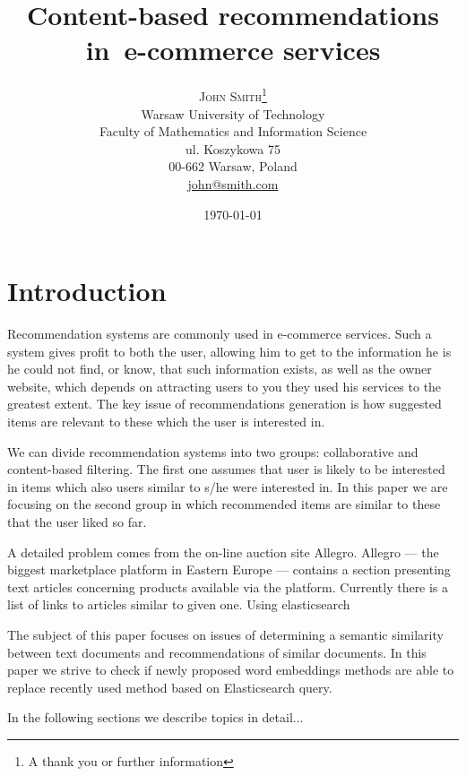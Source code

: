\documentclass[twoside,twocolumn]{article}
\title{Content-based recommendations in~e-commerce services} %
\author{%
	\textsc{John Smith}\thanks{A thank you or further information} \\[1ex] %
	\normalsize Warsaw University of Technology \\ %
	\normalsize Faculty of Mathematics and Information Science \\
	\normalsize ul. Koszykowa 75 \\
	\normalsize 00-662 Warsaw, Poland \\
	\normalsize \href{mailto:john@smith.com}{john@smith.com} %
}
\date{\today} %
\begin{document}
	
	\maketitle
	\section{Introduction}

	
	
	
	Recommendation systems are commonly used in e-commerce services. Such a system gives profit to both the user, allowing him to get to the information he is
	he could not find, or know, that such information exists, as well as the owner website, which depends on attracting users to you they used his services to the greatest extent. 	The key issue of recommendations generation is how suggested items are relevant to these which the user is interested in. 
	
	We can divide recommendation systems into two groups: collaborative and content-based filtering. The first one assumes that user is likely to be interested in items which also users similar to s/he were interested in. In this paper we are focusing on the second group in which recommended items are similar to these that the user liked so far.
	
	A detailed problem comes from the on-line auction site Allegro. Allegro --- the biggest marketplace platform in Eastern Europe --- contains a section presenting text articles concerning products available via the platform. Currently there is a list of links to articles similar to given one. Using elasticsearch
	
	The subject of this paper focuses on issues of determining a semantic similarity between text
	documents and recommendations of similar documents. In this paper we strive to check if newly proposed word embeddings methods are able to replace recently used method based on Elasticsearch query.%
	
	
	In the following sections we describe topics in detail...
\end{document}
